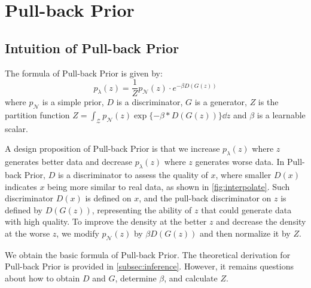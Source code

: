
\section{Pull-back Prior}\label{sec:pull_back_prior}

\subsection{Intuition of Pull-back Prior}\label{subsec:intuition}

The formula of Pull-back Prior is given by:
\begin{equation}\label{eq:pull_back_prior}
	p_\lambda(z) = \frac{1}{Z} p_\mathcal{N}(z) \cdot e^{- \beta D(G(z))} \tag{4}
\end{equation}
where $p_\mathcal{N}$ is a simple prior, $D$ is a discriminator, $G$ is a generator, $Z$ is the partition function $Z = \int_{\mathcal{Z}} p_\mathcal{N}(z) \exp\{- \beta * D(G(z))\} \dd z$ and $\beta$ is a learnable scalar.

A design proposition of Pull-back Prior is that we increase $p_\lambda(z)$ where $z$ generates better data and decrease $p_\lambda(z)$ where $z$ generates worse data. In Pull-back Prior, 
$D$ is a discriminator to assess the quality of $x$, where smaller $D(x)$ indicates $x$ being more similar to real data, as shown in \cref{fig:interpolate}. Such discriminator $D(x)$ is defined on $x$, and the pull-back discriminator on $z$ is defined by $D(G(z))$, representing the ability of $z$ that could generate data with high quality. To improve the density at the better $z$ and decrease the density at the worse $z$, we modify $p_\mathcal{N}(z)$ by $\beta D(G(z))$ and then normalize it by $Z$. 

We obtain the basic formula of Pull-back Prior. The theoretical derivation for Pull-back Prior is provided in \cref{subsec:inference}. However, it remains questions about how to obtain $D$ and $G$, determine $\beta$, and calculate $Z$. 

